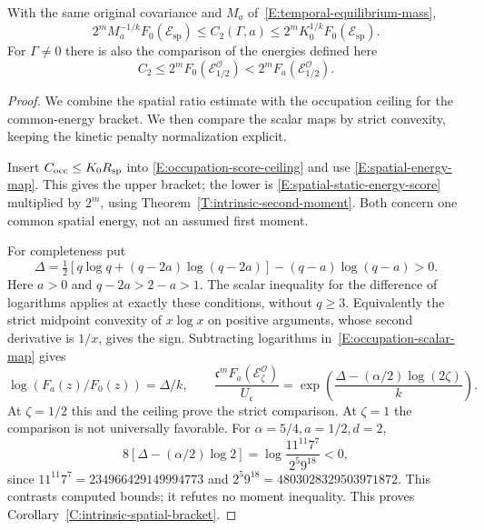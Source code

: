 \begin{corollary}
  \label{C:intrinsic-spatial-bracket}
  With the same original covariance and $M_a$
  of~\eqref{E:temporal-equilibrium-mass},
  \begin{equation}\label{E:intrinsic-spatial-bracket}
    2^m M_a^{-1/k}F_0(\mathcal{E}_{\mathrm{sp}})
    \le C_2(\Gamma,a)
    \le2^m K_0^{1/k}F_0(\mathcal{E}_{\mathrm{sp}}).
  \end{equation}
  For $\Gamma \ne 0$ there is also the comparison of the energies defined here
  \[
    C_2\le2^mF_0(\mathcal{E}_{1/2}^{\mathcal{O}})
    <2^mF_a(\mathcal{E}_{1/2}^{\mathcal{O}}).
  \]
\end{corollary}

\begin{proof}
  We combine the spatial ratio estimate with the occupation ceiling for the
  common-energy bracket. We then compare the scalar maps by strict convexity,
  keeping the kinetic penalty normalization explicit.

  Insert $C_{\rm occ} \le K_0R_{\mathrm{sp}}$ into
  \eqref{E:occupation-score-ceiling} and use \eqref{E:spatial-energy-map}. This
  gives the upper bracket; the lower is \eqref{E:spatial-static-energy-score}
  multiplied by $2^m$, using Theorem~\ref{T:intrinsic-second-moment}. Both
  concern one common spatial energy, not an assumed first moment.

  For completeness put
  \[
    \Delta=\tfrac12[q\log q+(q-2a)\log(q-2a)]
    -(q-a)\log(q-a)>0.
  \]
  Here $a > 0$ and $q-2a > 2-a > 1$. The scalar inequality for the difference of
  logarithms applies at exactly these conditions, without $q \ge 3$.
  Equivalently the strict midpoint convexity of $x\log x$ on positive arguments,
  whose second derivative is $1/x$, gives the sign. Subtracting logarithms
  in~\eqref{E:occupation-scalar-map} gives
  \[
    \log(F_a(z)/F_0(z))=\Delta/k,\qquad
    \frac{\mathfrak{c}^mF_a(\mathcal{E}_\zeta^{\mathcal{O}})}{U_{\mathfrak{c}}}
    =\exp\!\left(\frac{\Delta-(\alpha/2)\log(2\zeta)}{k}\right).
  \]
  At $\zeta = 1/2$ this and the ceiling prove the strict comparison. At $\zeta =
  1$ the comparison is not universally favorable. For $\alpha = 5/4,a = 1/2,d =
  2$,
  \[
    8[\Delta-(\alpha/2)\log2]
    =\log\frac{11^{11}7^7}{2^5 9^{18}}<0,
  \]
  since $11^{11}7^7 = 234966429149994773$ and $2^5 9^{18} =
  4803028329503971872$. This contrasts computed bounds; it refutes no moment
  inequality. This proves Corollary~\ref{C:intrinsic-spatial-bracket}.
\end{proof}

